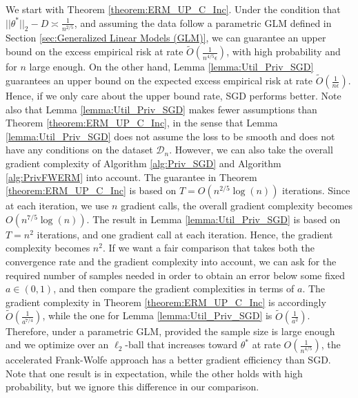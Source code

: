 \documentclass{article}
\begin{document}
We start with Theorem \ref{theorem:ERM_UP_C_Inc}. Under the condition that $||\theta^*||_2 - D \asymp \frac{1}{n^{2/5}}$, and assuming the data follow a parametric GLM defined in Section \ref{sec:Generalized Linear Models (GLM)}, we can guarantee an upper bound on the excess empirical risk at rate $\widetilde{O}\left(\frac{1}{n^{4/5}\epsilon}\right)$, with high probability and for $n$ large enough. On the other hand, Lemma \ref{lemma:Util_Priv_SGD} guarantees an upper bound on the expected excess empirical risk at rate $\widetilde{O}\left(\frac{1}{n\epsilon}\right)$. Hence, if we only care about the upper bound rate, SGD  performs better. Note also that Lemma \ref{lemma:Util_Priv_SGD} makes fewer assumptions than Theorem \ref{theorem:ERM_UP_C_Inc}, in the sense that Lemma \ref{lemma:Util_Priv_SGD} does not assume the loss to be smooth and does not have any conditions on the dataset $\mathcal{D}_n$. However, we can also take the overall gradient complexity of Algorithm \ref{alg:Priv_SGD} and Algorithm \ref{alg:PrivFWERM} into account. The guarantee in Theorem \ref{theorem:ERM_UP_C_Inc} is based on $T = O\left(n^{2/5}\log(n)\right)$ iterations. Since at each iteration, we use $n$ gradient calls, the overall gradient complexity becomes $O\left(n^{7/5}\log(n)\right)$. The result in Lemma \ref{lemma:Util_Priv_SGD} is based on $T = n^2$ iterations, and one gradient call at each iteration. Hence, the gradient complexity becomes $n^2$. If we want a fair comparison that takes both the convergence rate and the gradient complexity into account, we can ask for the required number of samples needed in order to obtain an error below some fixed $a \in (0, 1)$, and then compare the gradient complexities in terms of $a$. The gradient complexity in Theorem \ref{theorem:ERM_UP_C_Inc} is accordingly $\widetilde{O}\left(\frac{1}{a^{7/4}}\right)$, while the one for Lemma \ref{lemma:Util_Priv_SGD} is $\widetilde{O}\left(\frac{1}{a^2}\right)$. Therefore, under a parametric GLM, provided the sample size is large enough and we optimize over an $\ell_2$-ball that increases toward $\theta^*$ at rate $O\left(\frac{1}{n^{4/5}}\right)$, the accelerated Frank-Wolfe approach has a better gradient efficiency than SGD. Note that one result is in expectation, while the other holds with high probability, but we ignore this difference in our comparison. 
\end{document}
